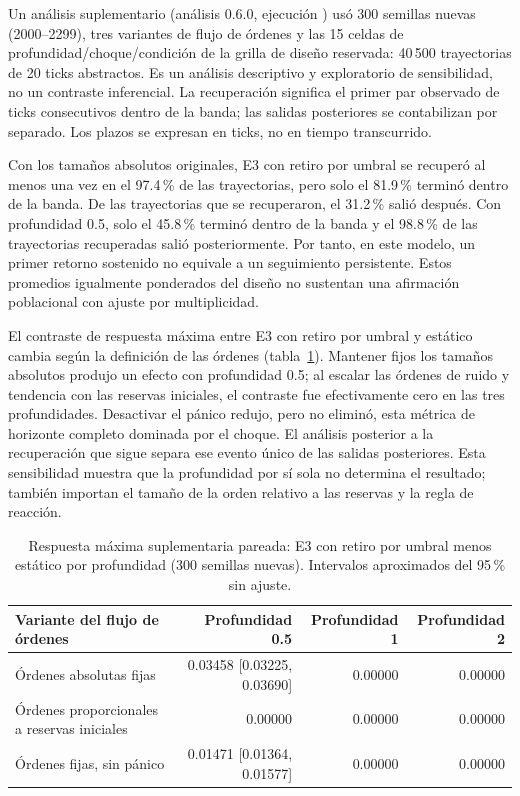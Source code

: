 Un análisis suplementario (análisis 0.6.0, ejecución \code{\EngineeringRunID}) usó 300 semillas nuevas (2000--2299), tres variantes de flujo de órdenes y las 15 celdas de profundidad/choque/condición de la grilla de diseño reservada: 40\,500 trayectorias de 20 ticks abstractos. Es un análisis descriptivo y exploratorio de sensibilidad, no un contraste inferencial. La recuperación significa el primer par observado de ticks consecutivos dentro de la banda; las salidas posteriores se contabilizan por separado. Los plazos se expresan en ticks, no en tiempo transcurrido.

Con los tamaños absolutos originales, E3 con retiro por umbral se recuperó al menos una vez en el 97.4\,\% de las trayectorias, pero solo el 81.9\,\% terminó dentro de la banda. De las trayectorias que se recuperaron, el 31.2\,\% salió después. Con profundidad 0.5, solo el 45.8\,\% terminó dentro de la banda y el 98.8\,\% de las trayectorias recuperadas salió posteriormente. Por tanto, en este modelo, un primer retorno sostenido no equivale a un seguimiento persistente. Estos promedios igualmente ponderados del diseño no sustentan una afirmación poblacional con ajuste por multiplicidad.

El contraste de respuesta máxima entre E3 con retiro por umbral y estático cambia según la definición de las órdenes (tabla~\ref{tab:engineering-sensitivity}). Mantener fijos los tamaños absolutos produjo un efecto con profundidad 0.5; al escalar las órdenes de ruido y tendencia con las reservas iniciales, el contraste fue efectivamente cero en las tres profundidades. Desactivar el pánico redujo, pero no eliminó, esta métrica de horizonte completo dominada por el choque. El análisis posterior a la recuperación que sigue separa ese evento único de las salidas posteriores. Esta sensibilidad muestra que la profundidad por sí sola no determina el resultado; también importan el tamaño de la orden relativo a las reservas y la regla de reacción.

\begin{table}[htbp]
\centering
\caption{Respuesta máxima suplementaria pareada: E3 con retiro por umbral menos estático por profundidad (300 semillas nuevas). Intervalos aproximados del 95\,\% sin ajuste.}
\label{tab:engineering-sensitivity}
\small
\begin{tabular}{@{}lrrr@{}}
\toprule
Variante del flujo de órdenes & Profundidad 0.5 & Profundidad 1 & Profundidad 2 \\
\midrule
Órdenes absolutas fijas & 0.03458 [0.03225, 0.03690] & 0.00000 & 0.00000 \\
Órdenes proporcionales a reservas iniciales & 0.00000 & 0.00000 & 0.00000 \\
Órdenes fijas, sin pánico & 0.01471 [0.01364, 0.01577] & 0.00000 & 0.00000 \\
\bottomrule
\end{tabular}
\end{table}

